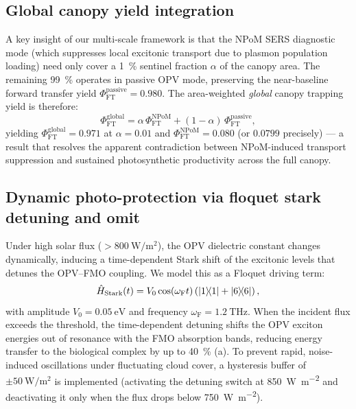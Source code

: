 \documentclass[preprint,12pt]{elsarticle}
\begin{document}
\subsection*{Global canopy yield integration}

A key insight of our multi-scale framework is that the NPoM SERS diagnostic mode (which suppresses local excitonic transport due to plasmon population loading) need only cover a \qty{1}{\percent} sentinel fraction $\alpha$ of the canopy area. The remaining \qty{99}{\percent} operates in passive OPV mode, preserving the near-baseline forward transfer yield $\Phi_{\mathrm{FT}}^{\mathrm{passive}} = 0.980$. The area-weighted \emph{global} canopy trapping yield is therefore:
\begin{equation}
  \Phi_{\mathrm{FT}}^{\mathrm{global}} = \alpha\,\Phi_{\mathrm{FT}}^{\mathrm{NPoM}} + (1-\alpha)\,\Phi_{\mathrm{FT}}^{\mathrm{passive}},
  \label{eq:phi_global}
\end{equation}
yielding $\Phi_{\mathrm{FT}}^{\mathrm{global}} = 0.971$ at $\alpha = 0.01$ and $\Phi_{\mathrm{FT}}^{\mathrm{NPoM}} = 0.080$ (or $0.0799$ precisely) --- a result that resolves the apparent contradiction between NPoM-induced transport suppression and sustained photosynthetic productivity across the full canopy.

\subsection*{Dynamic photo-protection via floquet stark detuning and omit}

Under high solar flux ($> \qty{800}{\W\per\m\squared}$), the OPV dielectric constant changes dynamically, inducing a time-dependent Stark shift of the excitonic levels that detunes the OPV--FMO coupling.
We model this as a Floquet driving term:
\begin{equation}
\hat{H}_{\mathrm{Stark}}(t) = V_0 \cos(\omega_{\mathrm{F}} t) \left( \dyad{1}{1} + \dyad{6}{6} \right),
\label{eq:stark_detuning}
\end{equation}
with amplitude $V_0 = \qty{0.05}{\eV}$ and frequency $\omega_{\mathrm{F}} = \qty{1.2}{\THz}$.
When the incident flux exceeds the threshold, the time-dependent detuning shifts the OPV exciton energies out of resonance with the FMO absorption bands, reducing energy transfer to the biological complex by up to \qty{40}{\percent} (a). To prevent rapid, noise-induced oscillations under fluctuating cloud cover, a hysteresis buffer of $\pm \qty{50}{\W\per\m\squared}$ is implemented (activating the detuning switch at \qty{850}{\W\per\m\squared} and deactivating it only when the flux drops below \qty{750}{\W\per\m\squared}).
\end{document}
